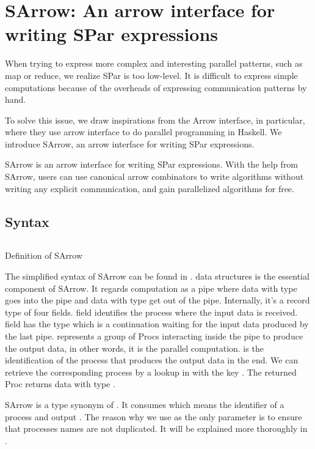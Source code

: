 \chapter{SArrow: An arrow interface for writing SPar expressions} \label{chap:arrow}
When trying to express more complex and interesting parallel patterns, such as map or reduce, we realize SPar is too low-level. It is difficult to express simple computations because of the overheads of expressing communication patterns by hand. %

To solve this issue, we draw inspirations from the Arrow interface, in particular, \cite{braunArrowsParallelComputation2018} where they use arrow interface to do parallel programming in Haskell. We introduce SArrow, an arrow interface for writing SPar expressions.

SArrow is an arrow interface for writing SPar expressions. With the help from SArrow, users can use canonical arrow combinators to write algorithms without writing any explicit communication, and gain parallelized algorithms for free.

\section{Syntax}
\begin{listing}[ht]
\inputminted{Haskell}{arrow/def.hs} 
\caption{Definition of SArrow}
\label{SArrow:def}
\end{listing}
The simplified syntax of SArrow can be found in .  data structures is the essential component of SArrow. It regards computation as a pipe where data with type  goes into the pipe and data with type  get out of the pipe. Internally, it's a record type of four fields.  field identifies the process where the input data is received.  field has the type  which is a continuation waiting for the input data produced by the last pipe.  represents a group of Procs interacting inside the pipe to produce the output data, in other words, it is the parallel computation.  is the identification of the process that produces the output data in the end. We can retrieve the corresponding process by a lookup in  with the key . The returned Proc returns data with type . 

SArrow is a type synonym of . It consumes  which means the identifier of a process and output . The reason why we use  as the only parameter is to ensure that processes names are not duplicated. It will be explained more thoroughly in .
